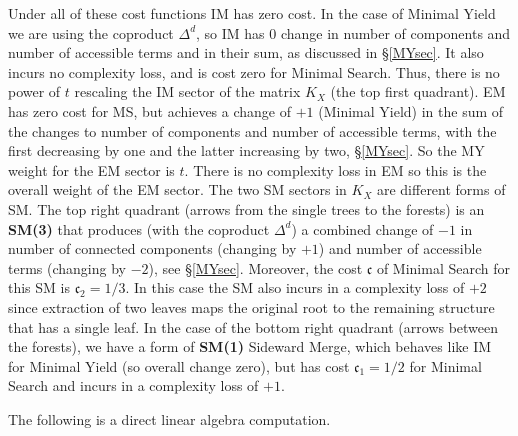 \documentclass[12pt]{amsart}
\numberwithin{equation}{section}
\def\fc{{\mathfrak c}}
\begin{document}
\proof
Under all of these cost functions IM has zero cost. In the case of Minimal Yield we
are using the coproduct $\Delta^d$, so IM has $0$ change in number of
components and number of accessible terms and in their sum, as discussed in \S \ref{MYsec}.
It also incurs no complexity loss, and is cost zero for Minimal Search. Thus, there is
no power of $t$ rescaling the IM sector of the matrix $K_X$ (the top first quadrant). 
EM has zero cost for MS, but achieves a change of $+1$ (Minimal Yield) in the sum
of the changes to number of components and number of accessible terms, with
the first decreasing by one and the latter increasing by two, \S \ref{MYsec}. So the
MY weight for the EM sector is $t$. There is no complexity loss in EM so this is
the overall weight of the EM sector. The two SM sectors in $K_X$ are different
forms of SM. The top right quadrant  (arrows from the single trees to the forests) is an {\bf SM(3)} that produces (with the
coproduct $\Delta^d$) a combined change of $-1$ in number of connected
components (changing by $+1$) and number of accessible terms (changing by $-2$),
see \S \ref{MYsec}. Moreover, the cost $\fc$ of Minimal Search for this 
SM is $\fc_2=1/3$. In this case the SM also incurs in a complexity loss of $+2$ since
extraction of two leaves maps the original root to the remaining structure that has a single leaf. 
In the case of the bottom right quadrant (arrows between the forests),
we have a form of {\bf SM(1)} Sideward Merge, which behaves like IM for Minimal Yield
(so overall change zero), but has cost $\fc_1=1/2$ for Minimal Search and incurs
in a complexity loss of $+1$. 
\endproof

\smallskip

The following is a direct linear algebra computation.
\end{document}
